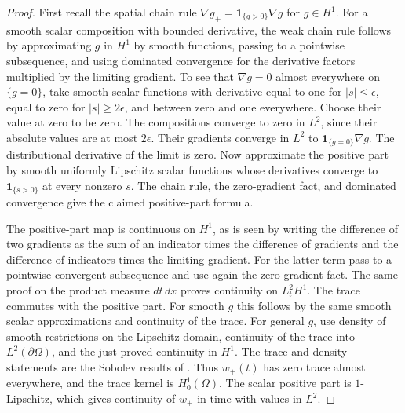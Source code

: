 \documentclass[11pt,oneside,openany]{book}
\theoremstyle{plain}
\theoremstyle{definition}
\theoremstyle{remark}
\begin{document}
\begin{proof}
First recall the spatial chain rule
\(\nabla g_+=\boldsymbol{1}_{\{g>0\}}\nabla g\) for \(g\in H^1\).
For a smooth scalar composition with bounded derivative,
the weak chain rule follows by approximating \(g\) in \(H^1\)
by smooth functions, passing to a pointwise subsequence, and
using dominated convergence for the derivative factors multiplied
by the limiting gradient. To see that \(\nabla g=0\) almost
everywhere on \(\{g=0\}\), take smooth scalar functions with
derivative equal to one for \(|s|\leq\epsilon\), equal to zero
for \(|s|\geq2\epsilon\), and between zero and one everywhere.
Choose their value at zero to be zero. The compositions converge
to zero in \(L^2\), since their absolute values are at most
\(2\epsilon\). Their gradients converge in \(L^2\) to
\(\boldsymbol{1}_{\{g=0\}}\nabla g\).
The distributional derivative of the limit is zero.
Now approximate the positive part by smooth uniformly
Lipschitz scalar functions whose derivatives converge to
\(\boldsymbol{1}_{\{s>0\}}\) at every nonzero \(s\).
The chain rule, the zero-gradient fact, and dominated convergence
give the claimed positive-part formula.

The positive-part map is continuous on \(H^1\), as is seen by
writing the difference of two gradients as the sum of
an indicator times the difference of gradients and
the difference of indicators times the limiting gradient.
For the latter term pass to a pointwise convergent subsequence
and use again the zero-gradient fact. The same proof on the
product measure \(dt\,dx\) proves continuity on \(L^2_tH^1\).
The trace commutes with the positive part. For smooth
\(g\) this follows by the same smooth scalar approximations
and continuity of the trace. For general \(g\), use density
of smooth restrictions on the Lipschitz domain, continuity
of the trace into \(L^2(\partial\Omega)\), and the just proved
continuity in \(H^1\). The trace and density statements are
the Sobolev results of \cite[Unit U5]{P102}.
Thus \(w_+(t)\) has zero trace almost everywhere, and the
trace kernel is \(H^1_0(\Omega)\).
The scalar positive part is \(1\)-Lipschitz, which gives
continuity of \(w_+\) in time with values in \(L^2\).


\end{proof}
\end{document}
